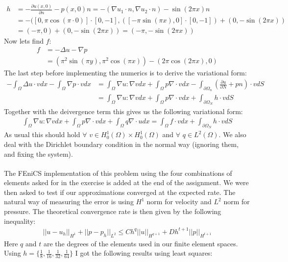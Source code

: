 \documentclass[11pt,a4paper]{report}
\begin{document}
\begin{align*}
h &= -\frac{\partial u(x,0)}{\partial n} - p(x,0)n  = -(\nabla u_1\cdot n,\nabla u_2\cdot n) -\sin(2\pi x)n\\
&= -( [0,\pi \cos(\pi \cdot0)] \cdot[0,-1], ( [-\pi \sin(\pi x),0]\cdot[0,-1]) +(0,-\sin(2\pi x)) \\
& = (-\pi,0)+(0,-\sin(2\pi x)) = (-\pi,-\sin(2\pi x))
\end{align*}
Now lets find $f$:
\begin{align*}
f &= -\Delta u - \nabla p \\
&= (\pi^2 \sin(\pi y),\pi^2 \cos(\pi x)) - (2\pi\cos(2\pi x),0) 
\end{align*} 
The last step before implementing the numerics is to derive the variational form:
\begin{align*}
-\int_{\Omega} \Delta u \cdot v dx - \int_{\Omega} \nabla p \cdot v dx &= \int_{\Omega} \nabla u :\nabla v dx + \int_{\Omega} p \nabla\cdot v dx -\int_{\partial\Omega_n}(\frac{\partial u}{\partial N} + pn)\cdot v dS \\
&=\int_{\Omega} \nabla u :\nabla v dx + \int_{\Omega} p \nabla\cdot v dx +\int_{\partial\Omega_N}h\cdot v dS 
\end{align*}
Together with the deivergence term this gives us the following variational form:
\begin{align*}
\int_{\Omega} \nabla u :\nabla v dx + \int_{\Omega} p \nabla\cdot v dx +\int_{\Omega} q\nabla\cdot u  dx = \int_{\Omega} f\cdot v dx +\int_{\partial\Omega_N}h\cdot v dS 
\end{align*}
As usual this should hold $\forall$ $v \in H_0^1(\Omega)\times H_0^1(\Omega)$ and $\forall$ $q \in L^2(\Omega)$. We also deal with the Dirichlet boundary condition in the normal way (ignoring them, and fixing the system). 
\\
\\
The FEniCS implementation of this problem using the four combinations of elements asked for in the exercise is added at the end of the assignment. We were then asked to test if our approximations converged at the expected rate. The natural way of measuring the error is using $H^1$ norm for velocity and $L^2$ norm for pressure. The theoretical convergence rate is then given by the following inequality:
\begin{align*}
||u-u_h||_{H^1}+||p-p_h||_{L^2} \leq Ch^{q}||u||_{H^{q+1}}+Dh^{t+1}||p||_{H^{t+1}}
\end{align*}
Here $q$ and $t$ are the degrees of the elements used in our finite element spaces. Using $h=\{\frac{1}{8},\frac{1}{16}, \frac{1}{32},\frac{1}{64}\}$ I got the following results using least squares:
\end{document}
